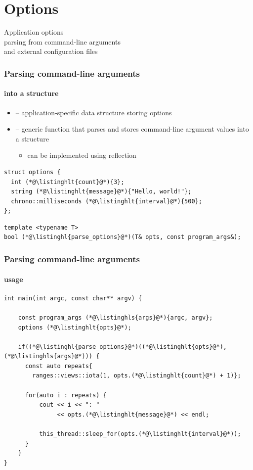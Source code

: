 \documentclass[compress,table,xcolor=table]{beamer}
\begin{document}
\section{Options}
\begin{frame}[c]
  \Huge
  \centering
  Application options\\
  \large
  parsing from command-line arguments\\
  and external configuration files
\end{frame}
\begin{frame}[fragile]
  \frametitle{Parsing command-line arguments}
  \framesubtitle{into a structure}
  \small
  \begin{itemize}
    \item {} -- application-specific data structure
      storing options
    \item {} -- generic function that parses and stores
      command-line argument values into a structure
    \begin{itemize}
      \item can be implemented using reflection
    \end{itemize}
  \end{itemize}
  \begin{lstlisting}[language=c++2x,basicstyle=\small\ttfamily]
struct options {
  int (*@\listinghlt{count}@*){3};
  string (*@\listinghlt{message}@*){"Hello, world!"};
  chrono::milliseconds (*@\listinghlt{interval}@*){500};
};
  \end{lstlisting}
  \vfill
  \begin{lstlisting}[language=c++2x,basicstyle=\footnotesize\ttfamily]
template <typename T>
bool (*@\listinghl{parse_options}@*)(T& opts, const program_args&);
  \end{lstlisting}
\end{frame}
\begin{frame}[fragile]
  \frametitle{Parsing command-line arguments}
  \framesubtitle{usage}
  \begin{lstlisting}[language=c++2x,basicstyle=\footnotesize\ttfamily]
int main(int argc, const char** argv) {

    const program_args (*@\listinghls{args}@*){argc, argv};
    options (*@\listinghlt{opts}@*);

    if((*@\listinghl{parse_options}@*)((*@\listinghlt{opts}@*), (*@\listinghls{args}@*))) {
      const auto repeats{
        ranges::views::iota(1, opts.(*@\listinghlt{count}@*) + 1)};

      for(auto i : repeats) {
          cout << i << ": "
               << opts.(*@\listinghlt{message}@*) << endl;

          this_thread::sleep_for(opts.(*@\listinghlt{interval}@*));
      }
    }
}  \end{lstlisting}
\end{frame}
\end{document}
